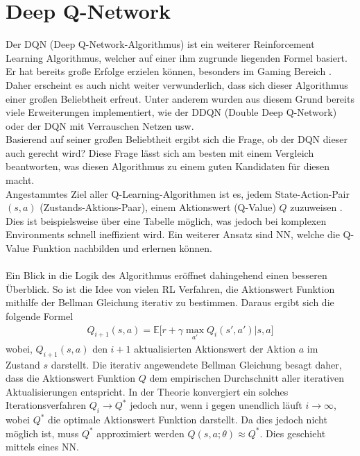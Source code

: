 \section{Deep Q-Network} \label{sec:Grundlagen_Deep_Q_Learning}
Der DQN (Deep Q-Network-Algorithmus) ist ein weiterer Reinforcement Learning Algorithmus, welcher auf einer ihm zugrunde liegenden Formel basiert. Er hat bereits große Erfolge erzielen können, besonders im Gaming Bereich \citep{DBLP:journals/corr/MnihKSGAWR13}. Daher erscheint es auch nicht weiter verwunderlich, dass sich dieser Algorithmus einer großen Beliebtheit erfreut. Unter anderem wurden aus diesem Grund bereits viele Erweiterungen implementiert, wie der DDQN (Double Deep Q-Network) oder der DQN mit Verrauschen Netzen usw.\\
Basierend auf seiner großen Beliebtheit ergibt sich die Frage, ob der DQN dieser auch gerecht wird? Diese Frage lässt sich am besten mit einem Vergleich beantworten, was diesen Algorithmus zu einem guten Kandidaten für diesen macht.\\ 
Angestammtes Ziel aller Q-Learning-Algorithmen ist es, jedem State-Action-Pair $(s,a)$ (Zustands-Aktions-Paar), einem Aktionswert (Q-Value) $Q$ zuzuweisen \citep[S. 126]{DRL_Lapan}. 
Dies ist beispielsweise über eine Tabelle möglich, was jedoch bei komplexen Environments schnell ineffizient wird. Ein weiterer Ansatz sind NN, welche die Q-Value Funktion nachbilden und erlernen können.\\
\\Ein Blick in die Logik des Algorithmus eröffnet dahingehend einen besseren Überblick. 
So ist die Idee von vielen RL Verfahren, die Aktionswert Funktion mithilfe der Bellman Gleichung iterativ zu bestimmen. Daraus ergibt sich die folgende Formel \citep{DBLP:journals/corr/MnihKSGAWR13}
\begin{align}
	Q_{i+1}(s,a) = \mathbb{E} \bigl\lbrack r + \gamma \max_{a'} Q_i(s',a')|s,a \bigr\rbrack
	\label{eq:Grundlagen_Bellman_Gleichung_iterativ}
\end{align}
wobei, $Q_{i+1}(s,a)$ den $i+1$ aktualisierten Aktionswert der Aktion $a$ im Zustand $s$ darstellt.
Die iterativ angewendete Bellman Gleichung  besagt daher, dass die Aktionswert Funktion $Q$ dem empirischen Durchschnitt aller iterativen Aktualisierungen entspricht.
In der Theorie konvergiert ein solches Iterationsverfahren $Q_i \longrightarrow Q^*$ jedoch nur, wenn i gegen unendlich läuft $i \longrightarrow \infty$, wobei $Q^*$ die optimale Aktionswert Funktion darstellt. Da dies jedoch nicht möglich ist, muss $Q^*$ approximiert werden $Q(s,a;\theta) \approx Q^*$. Dies geschieht mittels eines NN.
